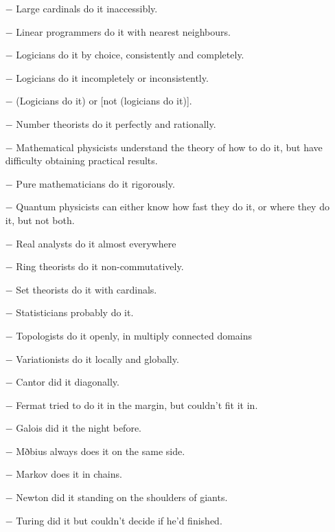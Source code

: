 \begin{itemize}
		\item[$-$] Large cardinals do it inaccessibly.
	
		\item[$-$] Linear programmers do it with nearest neighbours.
	
		\item[$-$] Logicians do it by choice, consistently and completely.
	
		\item[$-$] Logicians do it incompletely or inconsistently.
	
		\item[$-$] (Logicians do it) or [not (logicians do it)].
	
		\item[$-$] Number theorists do it perfectly and rationally.
	
		\item[$-$] Mathematical physicists understand the theory of how to do it, but have difficulty obtaining practical results.
	
		\item[$-$] Pure mathematicians do it rigorously.
	
		\item[$-$] Quantum physicists can either know how fast they do it, or where they do it, but not both.
	
		\item[$-$] Real analysts do it almost everywhere
	
		\item[$-$] Ring theorists do it non-commutatively.
	
		\item[$-$] Set theorists do it with cardinals.
	
		\item[$-$] Statisticians probably do it.
	
		\item[$-$] Topologists do it openly, in multiply connected domains
	
		\item[$-$] Variationists do it locally and globally.
	
		\item[$-$] Cantor did it diagonally.
	
		\item[$-$] Fermat tried to do it in the margin, but couldn't fit it in.
	
		\item[$-$] Galois did it the night before.
	
		\item[$-$] Mðbius always does it on the same side.
	
		\item[$-$] Markov does it in chains.
	
		\item[$-$] Newton did it standing on the shoulders of giants.
	
		\item[$-$] Turing did it but couldn't decide if he'd finished.
	 \end{itemize}
	 
